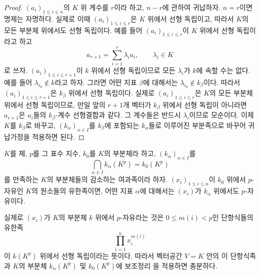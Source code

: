 \begin{proof}
$(a_i)_{1\leqslant i\leqslant n}$의 $K$ 위 계수를 $r$이라 하고,
$n-r$에 관하여 귀납하자. $n=r$이면 명제는 자명하다. 실제로 이때
$(a_i)_{1\leqslant i\leqslant r}$은 $K$ 위에서 선형 독립이고, 따라서
$K$의 모든 부분체 위에서도 선형 독립이다. 예를 들어
$(a_i)_{1\leqslant i\leqslant r}$이 $K$ 위에서 선형 독립이라고 하고
\[
a_{r+1}=\sum_{i=1}^r\lambda_i a_i,\qquad \lambda_i\in K
\]
로 쓰자. $(a_i)_{1\leqslant i\leqslant r+1}$이 $k$ 위에서 선형
독립이므로 모든 $\lambda_i$가 $k$에 속할 수는 없다. 예를 들어
$\lambda_{i_0}\notin k$라고 하자. 그러면 어떤 지표 $\beta$에 대해서는
$\lambda_{i_0}\notin k_\beta$이다. 따라서
$(a_i)_{1\leqslant i\leqslant r+1}$은 $k_\beta$ 위에서 선형 독립이다.
실제로 $(a_i)_{1\leqslant i\leqslant r}$은 $K$의 모든 부분체 위에서
선형 독립이므로, 만일 앞의 $r+1$개 벡터가 $k_\beta$ 위에서 선형
독립이 아니라면 $a_{r+1}$은 $a_i$들의 $k_\beta$-계수 선형결합과
같다. 그 계수들은 반드시 $\lambda_i$이므로 모순이다. 이제 $K$를
$k_\beta$로 바꾸고, $(k_\alpha)_{\alpha\in I}$를 $k_\beta$에 포함되는
$k_\alpha$들로 이루어진 부분족으로 바꾸어 귀납가정을 적용하면 된다.
\end{proof}

\begin{lemma}[21.8.2]
\label{0.21.8.2-ko}
$K$를 체, $p$를 그 표수 지수, $k_0$를 $K$의 부분체라 하고,
$(k_\alpha)_{\alpha\in I}$를
\[
\bigcap_{\alpha\in I}k_\alpha(K^p)=k_0(K^p)
\]
를 만족하는 $K$의 부분체들의 감소하는 여과족이라 하자.
$(x_i)_{1\leqslant i\leqslant n}$이 $k_0$ 위에서 $p$-자유인
$K$의 원소들의 유한족이면, 어떤 지표 $\alpha$에 대해서는
$(x_i)$가 $k_\alpha$ 위에서도 $p$-자유이다.

실제로 $(x_i)$가 $K$의 부분체 $k$ 위에서 $p$-자유라는 것은
$0\leqslant m(i)<p$인 단항식들의 유한족
\[
\prod_{i=1}^n x_i^{m(i)}
\]
이 $k(K^p)$ 위에서 선형 독립이라는 뜻이다. 따라서 벡터공간
$V=K$ 안의 이 단항식족과 $K$의 부분체 $k_\alpha(K^p)$ 및
$k_0(K^p)$에 보조정리 을 적용하면 충분하다.
\end{lemma}


